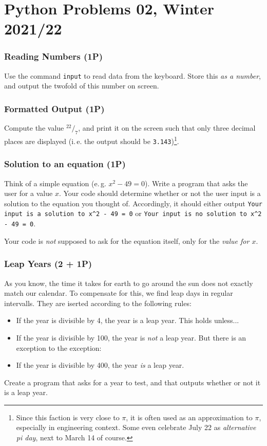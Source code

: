 \documentclass[
	english,
	fontsize=10pt,
	parskip=half,
	titlepage=true,
	DIV=12
]{scrartcl}
\newcommand*{\inPy}[1]{\texttt{#1}}
\newcommand*{\ie}{i.\,e. }
\newcommand*{\eg}{e.\,g. }
\begin{document}
\part*{Python Problems 02, Winter 2021/22}

\section{Reading Numbers (1\;P)}
Use the command \inPy{input} to read data from the keyboard. Store this \emph{as a number}, and output the twofold of this number on screen.

\section{Formatted Output (1\;P)}
Compute the value $^{22}/_{7}$, and print it on the screen such that only three decimal places are displayed (\ie the output should be \texttt{3.143})\footnote{Since this faction is very close to $\pi$, it is often used as an approximation to $\pi$, especially in engineering context. Some even celebrate July 22 as \emph{alternative pi day}, next to March 14 of course.}.

\section{Solution to an equation (1\;P)}
Think of a simple equation (\eg $x^2 - 49 = 0$). 
Write a program that asks the user for a value $x$. Your code should determine whether or not the user input is a solution to the equation you thought of. Accordingly, it should either output \texttt{Your input is a solution to x\textasciicircum 2 - 49 = 0} or \texttt{Your input is no solution to x\textasciicircum 2 - 49 = 0}.

Your code is \emph{not} supposed to ask for the equation itself, only for the \emph{value for $x$}.

\section{Leap Years (2 + 1\;P)}
As you know, the time it takes for earth to go around the sun does not exactly match our calendar. To compensate for this, we find leap days in regular intervalls. They are iserted according to the following rules:

\begin{itemize}
  \item If the year is divisible by 4, the year is a leap year. This holds unless...
  \item If the year is divisible by 100, the year is \emph{not} a leap year. But there is an exception to the exception:
  \item If the year is divisible by 400, the year \emph{is} a leap year.
\end{itemize}
Create a program that asks for a year to test, and that outputs whether or not it is a leap year.
\end{document}
